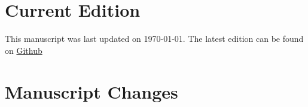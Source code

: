 
\section*{}

\section*{Current Edition}

This manuscript was last updated on \today. 
The latest edition can be found on \href{https://github.com/cmontalvo251/LaTeX/blob/master/Aerospace_Mechanics/aerospace_mechanics.pdf}{Github}

\section*{Manuscript Changes}


